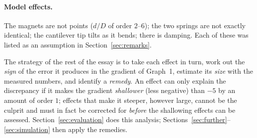\paragraph{Model effects.} The magnets are not points ($d/D$ of order $2$--$6$); the two springs are not exactly identical; the cantilever tip tilts as it bends; there is damping. Each of these was listed as an assumption in Section~\ref{sec:remarks}.

The strategy of the rest of the essay is to take each effect in turn, work out the \emph{sign} of the error it produces in the gradient of Graph~1, estimate its \emph{size} with the measured numbers, and identify a \emph{remedy}. An effect can only explain the discrepancy if it makes the gradient \emph{shallower} (less negative) than $-5$ by an amount of order $1$; effects that make it steeper, however large, cannot be the culprit and must in fact be corrected for \emph{before} the shallowing effects can be assessed. Section~\ref{sec:evaluation} does this analysis; Sections~\ref{sec:further}--\ref{sec:simulation} then apply the remedies.
